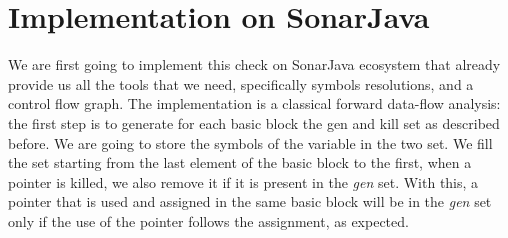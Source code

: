 \section{Implementation on SonarJava}
\label{sec:implementation_java}

We are first going to implement this check on SonarJava ecosystem that already provide us all the tools that we need, specifically symbols resolutions, and a control flow graph.
The implementation is a classical forward data-flow analysis: the first step is to generate for each basic block the gen and kill set as described before. 
We are going to store the symbols of the variable in the two set. 
We fill the set starting from the last element of the basic block to the first, when a pointer is killed, we also remove it if it is present in the \emph{gen} set.
With this, a pointer that is used and assigned in the same basic block will be in the \emph{gen} set only if the use of the pointer follows the assignment, as expected.

 

